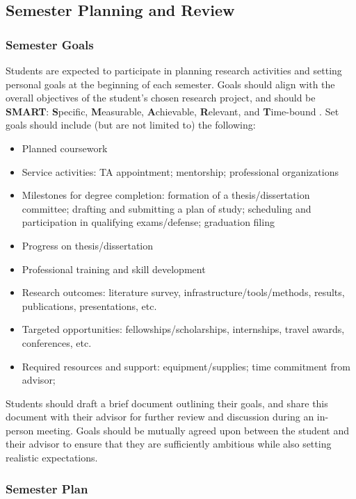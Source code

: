 \documentclass[12pt,a4paper,article,oneside]{memoir} %
\begin{document}
\subsection{Semester Planning and Review}

\subsubsection{Semester Goals}

Students are expected to participate in planning research activities and setting personal goals at the beginning of each semester. Goals should align with the overall objectives of the student's chosen research project, and should be \textbf{SMART}: \textbf{S}pecific, \textbf{M}easurable, \textbf{A}chievable, \textbf{R}elevant, and \textbf{T}ime-bound \citep{doran_1981}. Set goals should include (but are not limited to) the following:
\begin{itemize}
\item Planned coursework
\item Service activities: TA appointment; mentorship; professional organizations
\item Milestones for degree completion: formation of a thesis/dissertation committee; drafting and submitting a plan of study; scheduling and participation in qualifying exams/defense; graduation filing
\item Progress on thesis/dissertation
\item Professional training and skill development
\item Research outcomes: literature survey, infrastructure/tools/methods, results, publications, presentations, etc.
\item Targeted opportunities: fellowships/scholarships, internships, travel awards, conferences, etc.
\item Required resources and support: equipment/supplies; time commitment from advisor;
\end{itemize}
Students should draft a brief document outlining their goals, and share this document with their advisor for further review and discussion during an in-person meeting. Goals should be mutually agreed upon between the student and their advisor to ensure that they are sufficiently ambitious while also setting realistic expectations.

\subsubsection{Semester Plan}
\end{document}
